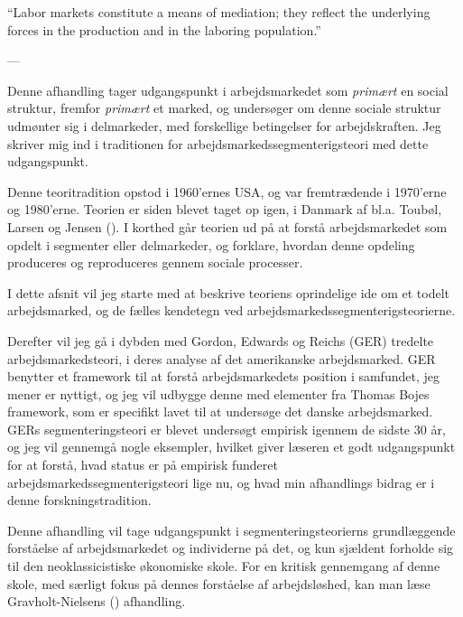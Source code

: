 \vspace{20pt} \epigraphfontsize{\small\itshape}
\epigraphfontsize{\small\itshape}
\epigraph{“Labor markets constitute a means of mediation; they reflect the underlying forces in the production and in the laboring population.”}{--- \textup{\parencite[177]{Edwards1979}}}


Denne afhandling tager udgangspunkt i arbejdsmarkedet som \emph{primært }en social struktur, fremfor \emph{primært} et marked, og undersøger om denne sociale struktur udmønter sig i delmarkeder, med forskellige betingelser for arbejdskraften. Jeg skriver mig ind i traditionen for arbejdsmarkedssegmenterigsteori med dette udgangspunkt.

Denne teoritradition opstod i 1960'ernes USA, og var fremtrædende i 1970'erne og 1980'erne. Teorien er siden blevet taget op igen, i Danmark af bl.a. Toubøl, Larsen og Jensen (\citeyear{Touboel2013}). I korthed går teorien ud på at forstå arbejdsmarkedet som opdelt i segmenter eller delmarkeder, og forklare, hvordan denne opdeling produceres og reproduceres gennem sociale processer.

I dette afsnit vil jeg starte med at beskrive teoriens oprindelige ide om et todelt arbejdsmarked, og de fælles kendetegn ved arbejdsmarkedssegmenterigsteorierne.

Derefter vil jeg gå i dybden med Gordon, Edwards og Reichs (GER) tredelte arbejdsmarkedsteori, i deres analyse af det amerikanske arbejdsmarked. GER benytter et framework til at forstå arbejdsmarkedets position i samfundet, jeg mener er nyttigt, og jeg vil udbygge denne med elementer fra Thomas Bojes framework, som er specifikt lavet til at undersøge det danske arbejdsmarked.
GERs segmenteringsteori er blevet undersøgt empirisk igennem de sidste 30 år, og jeg vil gennemgå nogle eksempler,  hvilket giver læseren et godt udgangspunkt for at forstå, hvad status er på empirisk funderet arbejdsmarkedssegmenterigsteori lige nu, og hvad min afhandlings bidrag er i denne forskningstradition. 

Denne afhandling vil tage udgangspunkt i segmenteringsteorierns grundlæggende forståelse af  arbejdsmarkedet og individerne på det, og kun sjældent forholde sig til den neoklassicistiske økonomiske skole. For en kritisk gennemgang af denne skole, med særligt fokus på dennes forståelse af arbejdsløshed, kan man læse Gravholt-Nielsens (\citeyear{Gravholt-Nielsen2016}) afhandling. 




